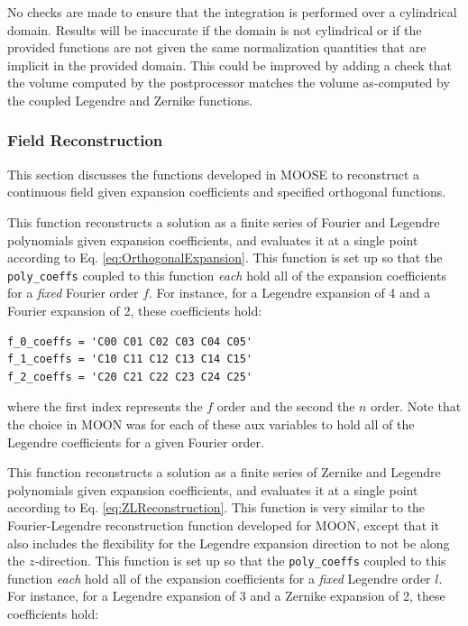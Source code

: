 \documentclass[10pt]{article}
\newcounter{subsubsubsection}[subsubsection]
\numberwithin{equation}{section} %
\begin{document}
\color{magenta}
No checks are made to ensure that the integration is performed over a cylindrical domain. Results will be inaccurate if the domain is not cylindrical or if the provided functions are not given the same normalization quantities that are implicit in the provided domain. This could be improved by adding a check that the volume computed by the postprocessor matches the volume as-computed by the coupled Legendre and Zernike functions.
\color{black}

\subsubsection{Field Reconstruction}
This section discusses the functions developed in MOOSE to reconstruct a continuous field given expansion coefficients and specified orthogonal functions.

This function reconstructs a solution as a finite series of Fourier and Legendre polynomials given expansion coefficients, and evaluates it at a single point according to Eq. \eqref{eq:OrthogonalExpansion}. This function is set up so that the {\tt poly\_coeffs} coupled to this function {\it each} hold all of the expansion coefficients for a {\it fixed} Fourier order \(f\). For instance, for a Legendre expansion of 4 and a Fourier expansion of 2, these coefficients hold:

\begin{lstlisting}
f_0_coeffs = 'C00 C01 C02 C03 C04 C05'
f_1_coeffs = 'C10 C11 C12 C13 C14 C15'
f_2_coeffs = 'C20 C21 C22 C23 C24 C25'
\end{lstlisting}

where the first index represents the \(f\) order and the second the \(n\) order. Note that the choice in MOON was for each of these aux variables to hold all of the Legendre coefficients for a given Fourier order.

This function reconstructs a solution as a finite series of Zernike and Legendre polynomials given expansion coefficients, and evaluates it at a single point according to Eq. \eqref{eq:ZLReconstruction}. This function is very similar to the Fourier-Legendre reconstruction function developed for MOON, except that it also includes the flexibility for the Legendre expansion direction to not be along the \(z\)-direction. This function is set up so that the {\tt poly\_coeffs} coupled to this function {\it each} hold all of the expansion coefficients for a {\it fixed} Legendre order \(l\). For instance, for a Legendre expansion of 3 and a Zernike expansion of 2, these coefficients hold:
\end{document}
